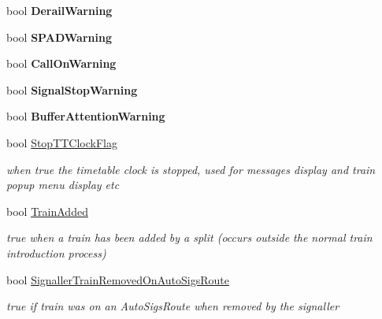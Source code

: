 \begin{DoxyCompactItemize}
\mbox{\label{class_t_train_controller_ae14cb1df9539743db54f5828d9aceb03}} 
bool {\bfseries Derail\+Warning}
\item 
\mbox{\label{class_t_train_controller_a580d5d38f3783674fd6a5d82c4c8d4fb}} 
bool {\bfseries S\+P\+A\+D\+Warning}
\item 
\mbox{\label{class_t_train_controller_a4513fe3cb3e6039a064cd8df203ec1d9}} 
bool {\bfseries Call\+On\+Warning}
\item 
\mbox{\label{class_t_train_controller_ae630206a9d12fad0e93661d329b5c737}} 
bool {\bfseries Signal\+Stop\+Warning}
\item 
\mbox{\label{class_t_train_controller_ada39cdbfadd136d813752252317f624f}} 
bool {\bfseries Buffer\+Attention\+Warning}
\item 
\mbox{\label{class_t_train_controller_a4cb4f95016d09ccf3007ede186474e09}} 
bool \mbox{\hyperlink{class_t_train_controller_a4cb4f95016d09ccf3007ede186474e09}{Stop\+T\+T\+Clock\+Flag}}
\begin{DoxyCompactList}\small\item\em when true the timetable clock is stopped, used for messages display and train popup menu display etc \end{DoxyCompactList}\item 
\mbox{\label{class_t_train_controller_a646a91d8cedea54902a6fdc0ef67fff1}} 
bool \mbox{\hyperlink{class_t_train_controller_a646a91d8cedea54902a6fdc0ef67fff1}{Train\+Added}}
\begin{DoxyCompactList}\small\item\em true when a train has been added by a split (occurs outside the normal train introduction process) \end{DoxyCompactList}\item 
\mbox{\label{class_t_train_controller_a39452a716da27a51a796b7e6a2bcad5b}} 
bool \mbox{\hyperlink{class_t_train_controller_a39452a716da27a51a796b7e6a2bcad5b}{Signaller\+Train\+Removed\+On\+Auto\+Sigs\+Route}}
\begin{DoxyCompactList}\small\item\em true if train was on an Auto\+Sigs\+Route when removed by the signaller \end{DoxyCompactList}\item 

\end{DoxyCompactItemize}

